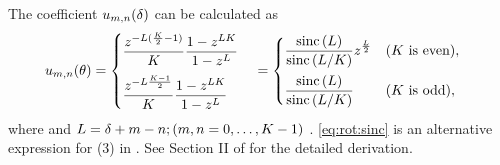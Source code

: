 \documentclass[sip,biber]{now-journal}
\begin{document}
The coefficient $u _{m,n}(\delta)$ can be calculated as
\begin{align}
  u _{m,n}(\theta)
  &=
    \begin{cases}
      \displaystyle\frac{z ^{- L (\frac{K}{2} - 1) }}{K} \frac{1 - z ^{L K}}{1 - z ^{L}}\\[1em]
      \displaystyle\frac{z ^{- L \frac{K - 1}{2}}}{K} \frac{1 - z ^{L K}}{1 - z ^{L}}
    \end{cases}
  =
    \begin{cases}
      \displaystyle \frac{\operatorname{sinc}{(L)}}{\operatorname{sinc}{\left(L / K\right)}} z ^{\frac{L}{2}} & (\text{$K$ is even}),\\[1em]
      \displaystyle \frac{\operatorname{sinc}{(L)}}{\operatorname{sinc}{\left(L / K\right)}} & (\text{$K$ is odd}),
    \end{cases}\label{eq:rot:sinc}
\end{align}
where and $L =\delta + m - n; (m, n = 0, \dots, K - 1)$ \cite{Wakabayashi:2023:ASLP}.
\eqref{eq:rot:sinc} is an alternative expression for (3) in \cite{Wakabayashi:2023:ASLP}.
See Section II of \cite{Wakabayashi:2023:ASLP} for the detailed derivation.
\end{document}
